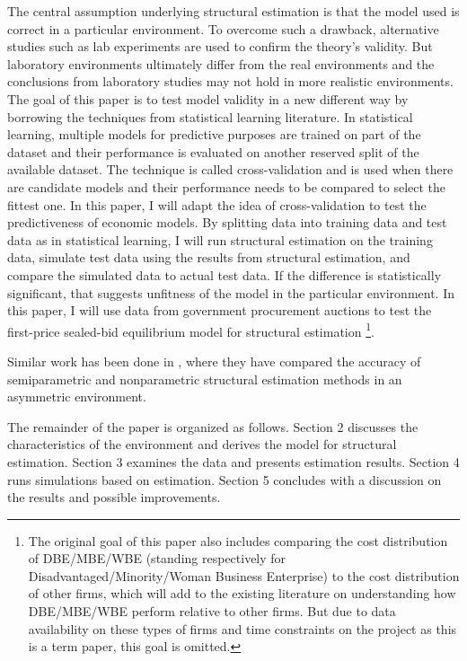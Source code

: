 \documentclass[11pt]{article}
\begin{document}
The central assumption underlying structural estimation is that the model used 
is correct in a particular environment. To overcome such a drawback, alternative 
studies such as lab experiments are used to confirm the theory's validity. But 
laboratory environments ultimately differ from the real environments and 
the conclusions from laboratory studies may not hold in more realistic environments. 
The goal of this paper is to test model validity in a new different way by 
borrowing the techniques from statistical learning literature. In statistical 
learning, multiple models for predictive purposes are trained on part of the dataset 
and their performance is evaluated on another reserved split of 
the available dataset. The technique is called cross-validation 
and is used when there are candidate models and their performance needs to 
be compared to select the fittest one. In this paper, I will adapt the idea 
of cross-validation to test the predictiveness of economic models. By splitting 
data into training data and test data as in statistical learning, I will 
run structural estimation on the training data, simulate test data using the 
results from structural estimation, and compare the simulated data to actual 
test data. If the difference is statistically significant, that suggests 
unfitness of the model in the particular environment. 
In this paper, I will use data from government procurement auctions to test 
the first-price sealed-bid equilibrium model \cite{RileySamuelson1981} 
for structural estimation
\footnote{The original goal of this paper also includes comparing the cost 
distribution of DBE/MBE/WBE (standing respectively for Disadvantaged/Minority/Woman
Business Enterprise) to the cost distribution of other firms, which will add 
to the existing literature on understanding how DBE/MBE/WBE perform relative 
to other firms. But due to data availability on these types of firms 
and time constraints on the project as this is a 
term paper, this goal is omitted. }.

Similar work has been done in \citeauthor{ChernomazYushioto2019} 
\citeyear{ChernomazYushioto2019}, where they have compared the accuracy 
of semiparametric and nonparametric structural estimation methods in an 
asymmetric environment.  

The remainder of the paper is organized as follows. Section 2 discusses the 
characteristics of the environment and derives the model for structural 
estimation. Section 3 examines the data and presents estimation results. 
Section 4 runs simulations based on estimation. Section 5 concludes with 
a discussion on the results and possible improvements. 
\end{document}
